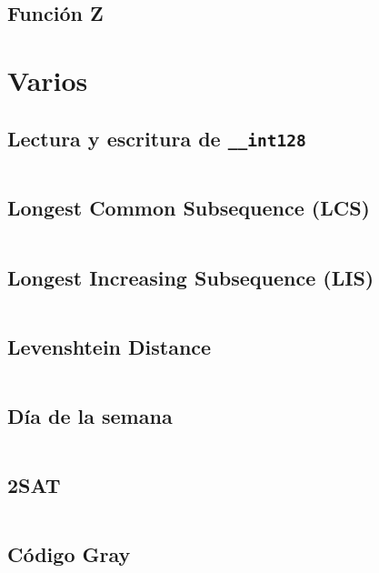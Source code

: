\documentclass[11pt]{article}
\begin{document}
		
		\subsection{Función Z}
		
	
	\newpage
	\section{Varios}
		\subsection{Lectura y escritura de \texttt{\_\_int128}}
		\inputminted[tabsize=2,breaklines,firstline=46,lastline=83,fontsize=\small]{c++}{misc.cpp}
		
		\subsection{Longest Common Subsequence (LCS)}
		\inputminted[tabsize=2,breaklines,firstline=21,lastline=33,fontsize=\small]{c++}{misc.cpp}
		
		\subsection{Longest Increasing Subsequence (LIS)}
		\inputminted[tabsize=2,breaklines,firstline=5,lastline=19,fontsize=\small]{c++}{misc.cpp}
		
		\subsection{Levenshtein Distance}
		\inputminted[tabsize=2,breaklines,firstline=145,lastline=156,fontsize=\small]{c++}{misc.cpp}
		
		\subsection{Día de la semana}
		\inputminted[tabsize=2,breaklines,firstline=35,lastline=44,fontsize=\small]{c++}{misc.cpp}
		
		\subsection{2SAT}
		\inputminted[tabsize=2,breaklines,firstline=85,lastline=128,fontsize=\small]{c++}{misc.cpp}
		
		\subsection{Código Gray}
		\inputminted[tabsize=2,breaklines,firstline=130,lastline=143,fontsize=\small]{c++}{misc.cpp}
\end{document}
